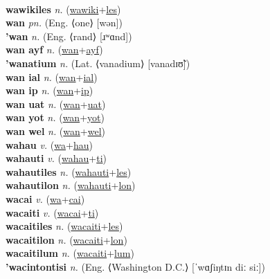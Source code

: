  \label{wawiki} \\
\textbf{wawikiles} \textit{n.} (\hyperref[wawiki]{wawiki}+\hyperref[les]{les})
 \label{wawikiles} \\
\textbf{wan} \textit{pn.} (Eng. ⟨one⟩ [wən])
 \label{wan} \\
\textbf{'wan} \textit{n.} (Eng. ⟨rand⟩ [ɹʷɑnd])
 \label{'wan} \\
\textbf{wan ayf} \textit{n.} (\hyperref[wan]{wan}+\hyperref[ayf]{ayf})
 \label{wan ayf} \\
\textbf{'wanatium} \textit{n.} (Lat. ⟨vanadium⟩ [vanadɪʊ̃])
 \label{'wanatium} \\
\textbf{wan ial} \textit{n.} (\hyperref[wan]{wan}+\hyperref[ial]{ial})
 \label{wan ial} \\
\textbf{wan ip} \textit{n.} (\hyperref[wan]{wan}+\hyperref[ip]{ip})
 \label{wan ip} \\
\textbf{wan uat} \textit{n.} (\hyperref[wan]{wan}+\hyperref[uat]{uat})
 \label{wan uat} \\
\textbf{wan yot} \textit{n.} (\hyperref[wan]{wan}+\hyperref[yot]{yot})
 \label{wan yot} \\
\textbf{wan wel} \textit{n.} (\hyperref[wan]{wan}+\hyperref[wel]{wel})
 \label{wan wel} \\
\textbf{wahau} \textit{v.} (\hyperref[wa]{wa}+\hyperref[hau]{hau})
 \label{wahau} \\
\textbf{wahauti} \textit{v.} (\hyperref[wahau]{wahau}+\hyperref[ti]{ti})
 \label{wahauti} \\
\textbf{wahautiles} \textit{n.} (\hyperref[wahauti]{wahauti}+\hyperref[les]{les})
 \label{wahautiles} \\
\textbf{wahautilon} \textit{n.} (\hyperref[wahauti]{wahauti}+\hyperref[lon]{lon})
 \label{wahautilon} \\
\textbf{wacai} \textit{v.} (\hyperref[wa]{wa}+\hyperref[cai]{cai})
 \label{wacai} \\
\textbf{wacaiti} \textit{v.} (\hyperref[wacai]{wacai}+\hyperref[ti]{ti})
 \label{wacaiti} \\
\textbf{wacaitiles} \textit{n.} (\hyperref[wacaiti]{wacaiti}+\hyperref[les]{les})
 \label{wacaitiles} \\
\textbf{wacaitilon} \textit{n.} (\hyperref[wacaiti]{wacaiti}+\hyperref[lon]{lon})
 \label{wacaitilon} \\
\textbf{wacaitilum} \textit{n.} (\hyperref[wacaiti]{wacaiti}+\hyperref[lum]{lum})
 \label{wacaitilum} \\
\textbf{'wacintontisi} \textit{n.} (Eng. ⟨Washington D.C.⟩ [ˈwɑʃiŋtɪn diː siː])
